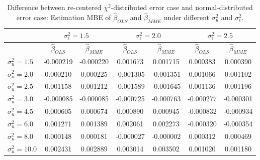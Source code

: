 \documentclass{article}
\begin{document}
\begin{table}[ht]
    \centering
    \caption{Difference between re-centered $\chi^2$-distributed error case and normal-distributed error case: Estimation MBE of $\hat{\beta}_{OLS}$ and $\hat{\beta}_{MME}$ under different $\sigma^2_u$ and $\sigma^2_\epsilon$.}
    \label{Tab:MBE_diff_chi_normal}
    \begin{tabular}[t]{lcccccc}
        \hline
        &\multicolumn{2}{c}{$\sigma^2_\epsilon=1.5$}&\multicolumn{2}{c}{$\sigma^2_\epsilon=2.0$}&\multicolumn{2}{c}{$\sigma^2_\epsilon=2.5$}\\
        \hline
        &$\hat{\beta}_{OLS}$&$\hat{\beta}_{MME}$&$\hat{\beta}_{OLS}$&$\hat{\beta}_{MME}$&$\hat{\beta}_{OLS}$&$\hat{\beta}_{MME}$\\
        \hline
        $\sigma^2_u = 1.5$&-0.000219&-0.000220&0.001673&0.001715&0.000383&0.000390\\
        $\sigma^2_u = 2.0$&0.000210&0.000225&-0.001305&-0.001351&0.001066&0.001102\\
        $\sigma^2_u = 2.5$&0.001158&0.001212&-0.001589&-0.001645&0.001136&0.001196\\
        $\sigma^2_u = 3.0$&-0.000085&-0.000085&-0.000725&-0.000763&-0.000277&-0.000301\\
        $\sigma^2_u = 4.5$&0.000605&0.000674&0.000890&0.000945&-0.000832&-0.000934\\
        $\sigma^2_u = 6.0$&0.001271&0.001389&0.002061&0.002273&-0.000320&-0.000354\\
        $\sigma^2_u = 8.0$&0.000148&0.000181&-0.000027&-0.000002&0.000312&0.000469\\
        $\sigma^2_u = 10.0$&0.002431&0.002889&0.003014&0.003502&0.001020&0.001180\\
        \hline
    \end{tabular}
\end{table}
\end{document}
